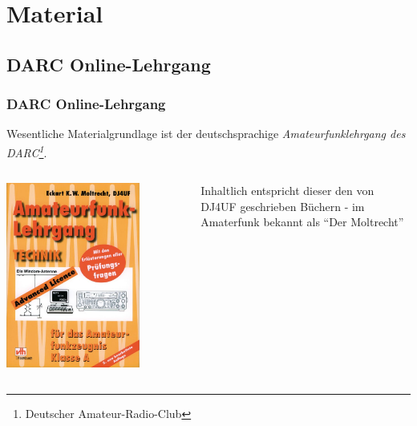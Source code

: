 \section{Material}

\subsection[DARC-Lehrgang]{DARC Online-Lehrgang}

\begin{frame}
    \frametitle{DARC Online-Lehrgang}

    Wesentliche Materialgrundlage ist der deutschsprachige
    \emph{Amateurfunklehrgang\hyperlink{refs}{\cite{darc}} des
    DARC\footnote{Deutscher Amateur-Radio-Club}}.

    \begin{columns}[c]
        \column[c]{5cm}
        \begin{center}
            \includegraphics[width=0.75\textwidth,height=0.75\textheight,keepaspectratio]{a00/Amateurfunklehrgang-Technik-fuer-das-Amateurfunkzeugnis-Klasse-A.jpg}
            \tiny \hyperlink{refs}{\cite{darcv}}
        \end{center}
        \column{5cm}
            Inhaltlich entspricht dieser den von DJ4UF geschrieben Büchern - im
            Amaterfunk bekannt als ``Der Moltrecht''\hyperlink{refs}{\cite{dj4uf}}
    \end{columns}

\end{frame}

